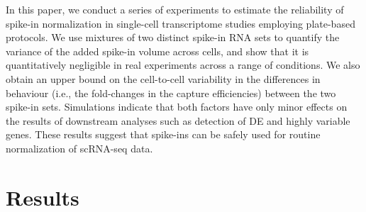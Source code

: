 \documentclass{article}
\begin{document}
In this paper, we conduct a series of experiments to estimate the reliability of spike-in normalization in single-cell transcriptome studies employing plate-based protocols.
We use mixtures of two distinct spike-in RNA sets to quantify the variance of the added spike-in volume across cells, 
and show that it is quantitatively negligible in real experiments across a range of conditions. 
We also obtain an upper bound on the cell-to-cell variability in the differences in behaviour (i.e., the fold-changes in the capture efficiencies) between the two spike-in sets.
Simulations indicate that both factors have only minor effects on the results of downstream analyses such as detection of DE and highly variable genes.
These results suggest that spike-ins can be safely used for routine normalization of scRNA-seq data.

% 

\section{Results}

\newcommand\variance{\mbox{var}}
\end{document}
